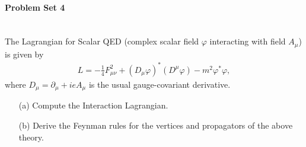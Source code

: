 \paragraph*{Problem Set 4} %
\\
The Lagrangian for Scalar QED (complex scalar field $\varphi$ interacting with field $A_\mu$) is given by
\begin{align}
    L = -\frac{1}{4} F_{\mu\nu}^2 + (D_\mu \varphi)^* (D^\mu \varphi) - m^2 \varphi^* \varphi, 
\end{align}
where $D_\mu = \partial_\mu + ieA_\mu$ is the usual gauge-covariant derivative.
\begin{itemize}
    \item[(a)] Compute the Interaction Lagrangian.
    \item[(b)] Derive the Feynman rules for the vertices and propagators of the above theory.
\end{itemize}
\bigskip\bigskip\hline\hline\bigskip
